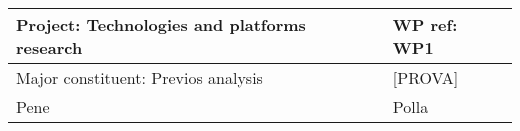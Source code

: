     \begin{tabular}{ | m{} | m{1cm} }
        \hline
        Project: \textbf{Technologies and platforms research}  & WP ref: \textbf{WP1} \\
        \hline
        Major constituent: Previos analysis & [PROVA] \\
        \hline
        Pene & Polla \\
        \hline
    \end{tabular}
